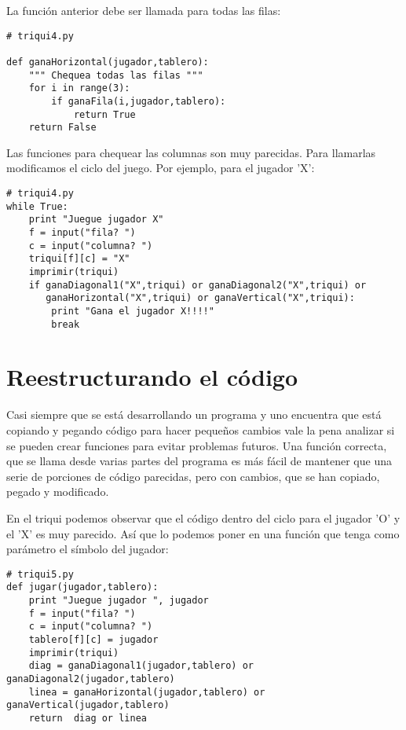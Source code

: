 La función anterior debe ser llamada para todas las filas:

\beforeverb
\begin{verbatim}
# triqui4.py

def ganaHorizontal(jugador,tablero):
    """ Chequea todas las filas """
    for i in range(3):
        if ganaFila(i,jugador,tablero):
            return True
    return False
\end{verbatim}
\afterverb

Las funciones para chequear las columnas son muy parecidas. Para llamarlas  
modificamos el ciclo del juego. Por ejemplo, para el jugador 'X':

\beforeverb
\begin{verbatim}
# triqui4.py
while True:
    print "Juegue jugador X"
    f = input("fila? ")
    c = input("columna? ")
    triqui[f][c] = "X"
    imprimir(triqui)
    if ganaDiagonal1("X",triqui) or ganaDiagonal2("X",triqui) or 
       ganaHorizontal("X",triqui) or ganaVertical("X",triqui):
        print "Gana el jugador X!!!!"
        break
\end{verbatim}
\afterverb

\section{Reestructurando el código}

Casi siempre que se está desarrollando un programa y uno encuentra que está copiando y
pegando código para hacer pequeños cambios vale la pena analizar si se pueden crear
funciones para evitar problemas futuros. Una función correcta, que se llama desde
varias partes del programa es más fácil de mantener que una serie de porciones de 
código parecidas, pero con cambios, que se han copiado, pegado y modificado.

En el triqui podemos observar que el código dentro del ciclo para el jugador 'O' 
y el 'X' es muy parecido. Así que  lo podemos poner en una
función que tenga como parámetro el símbolo del jugador:

\beforeverb
\begin{verbatim}
# triqui5.py
def jugar(jugador,tablero):
    print "Juegue jugador ", jugador
    f = input("fila? ")
    c = input("columna? ")
    tablero[f][c] = jugador
    imprimir(triqui)
    diag = ganaDiagonal1(jugador,tablero) or ganaDiagonal2(jugador,tablero)
    linea = ganaHorizontal(jugador,tablero) or ganaVertical(jugador,tablero)
    return  diag or linea
\end{verbatim}
\afterverb

